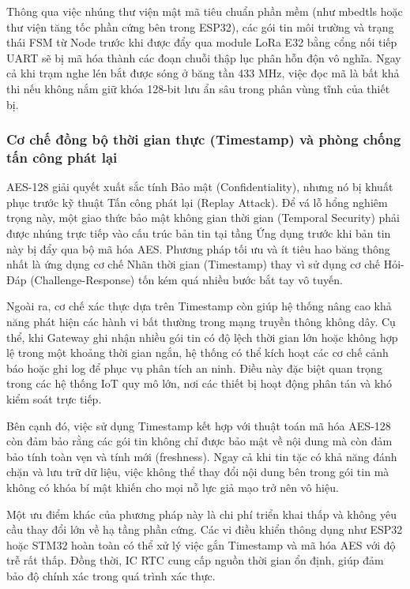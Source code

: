 Thông qua việc nhúng thư viện mật mã tiêu chuẩn phần mềm (như mbedtls hoặc thư viện tăng tốc phần cứng bên trong ESP32), các gói tin môi trường và trạng thái FSM từ Node trước khi được đẩy qua module LoRa E32 bằng cổng nối tiếp UART sẽ bị mã hóa thành các đoạn chuỗi thập lục phân hỗn độn vô nghĩa. Ngay cả khi trạm nghe lén bắt được sóng ở băng tần 433 MHz, việc đọc mã là bất khả thi nếu không nắm giữ khóa 128-bit lưu ẩn sâu trong phân vùng tĩnh của thiết bị.
\subsubsection{Cơ chế đồng bộ thời gian thực (Timestamp) và phòng chống tấn công phát lại}
AES-128 giải quyết xuất sắc tính Bảo mật (Confidentiality), nhưng nó bị khuất phục trước kỹ thuật Tấn công phát lại (Replay Attack). Để vá lỗ hổng nghiêm trọng này, một giao thức bảo mật không gian thời gian (Temporal Security) phải được nhúng trực tiếp vào cấu trúc bản tin tại tầng Ứng dụng trước khi bản tin này bị đẩy qua bộ mã hóa AES.
Phương pháp tối ưu và ít tiêu hao băng thông nhất là ứng dụng cơ chế Nhãn thời gian (Timestamp) thay vì sử dụng cơ chế Hỏi-Đáp (Challenge-Response) tốn kém quá nhiều bước bắt tay vô tuyến.

Ngoài ra, cơ chế xác thực dựa trên Timestamp còn giúp hệ thống nâng cao khả năng phát hiện các hành vi bất thường trong mạng truyền thông không dây. Cụ thể, khi Gateway ghi nhận nhiều gói tin có độ lệch thời gian lớn hoặc không hợp lệ trong một khoảng thời gian ngắn, hệ thống có thể kích hoạt các cơ chế cảnh báo hoặc ghi log để phục vụ phân tích an ninh. Điều này đặc biệt quan trọng trong các hệ thống IoT quy mô lớn, nơi các thiết bị hoạt động phân tán và khó kiểm soát trực tiếp.

Bên cạnh đó, việc sử dụng Timestamp kết hợp với thuật toán mã hóa AES-128 còn đảm bảo rằng các gói tin không chỉ được bảo mật về nội dung mà còn đảm bảo tính toàn vẹn và tính mới (freshness). Ngay cả khi tin tặc có khả năng đánh chặn và lưu trữ dữ liệu, việc không thể thay đổi nội dung bên trong gói tin mà không có khóa bí mật khiến cho mọi nỗ lực giả mạo trở nên vô hiệu.

Một ưu điểm khác của phương pháp này là chi phí triển khai thấp và không yêu cầu thay đổi lớn về hạ tầng phần cứng. Các vi điều khiển thông dụng như ESP32 hoặc STM32 hoàn toàn có thể xử lý việc gắn Timestamp và mã hóa AES với độ trễ rất thấp. Đồng thời, IC RTC cung cấp nguồn thời gian ổn định, giúp đảm bảo độ chính xác trong quá trình xác thực.

